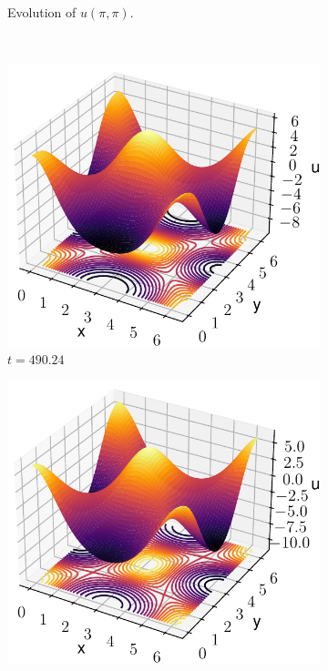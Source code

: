 \documentclass[twoside]{article}
\begin{document}
\begin{figure}
\begin{subfigure}[ht]{0.32\textwidth}
    \caption{Evolution of $u(\pi,\pi)$.}
  \end{subfigure}\\
  \begin{subfigure}[ht]{0.24\textwidth}
    \includegraphics[width=\textwidth]{images/slice_nu1_0.35_nu2_0.3_time_490.24.pdf}
    \caption{$t=490.24$}
  \end{subfigure}\hfill
  \begin{subfigure}[ht]{0.24\textwidth}
    \includegraphics[width=\textwidth]{images/slice_nu1_0.35_nu2_0.3_time_491.7.pdf}

\end{subfigure}
\end{figure}
\end{document}

